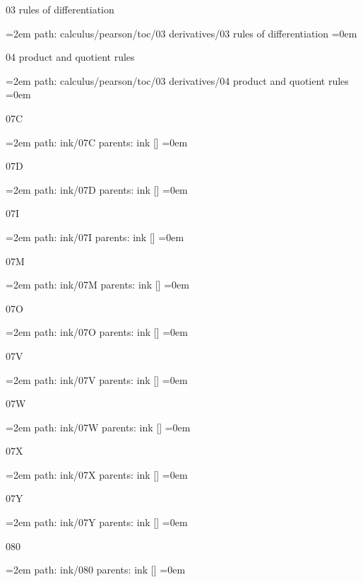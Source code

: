 03 rules of differentiation
\smallskip
\par\begingroup
\leftskip=2em
path: calculus/pearson/toc/03 derivatives/03 rules of differentiation
\smallskip
\leftskip=0em
\par\endgroup
\bigskip
{}
04 product and quotient rules
\smallskip
\par\begingroup
\leftskip=2em
path: calculus/pearson/toc/03 derivatives/04 product and quotient rules
\smallskip
\leftskip=0em
\par\endgroup
\bigskip
{}
07C
\smallskip
\par\begingroup
\leftskip=2em
path: ink/07C
\smallskip
parents:  ink []
\smallskip
\leftskip=0em
\par\endgroup
\bigskip
{}
07D
\smallskip
\par\begingroup
\leftskip=2em
path: ink/07D
\smallskip
parents:  ink []
\smallskip
\leftskip=0em
\par\endgroup
\bigskip
{}
07I
\smallskip
\par\begingroup
\leftskip=2em
path: ink/07I
\smallskip
parents:  ink []
\smallskip
\leftskip=0em
\par\endgroup
\bigskip
{}
07M
\smallskip
\par\begingroup
\leftskip=2em
path: ink/07M
\smallskip
parents:  ink []
\smallskip
\leftskip=0em
\par\endgroup
\bigskip
{}
07O
\smallskip
\par\begingroup
\leftskip=2em
path: ink/07O
\smallskip
parents:  ink []
\smallskip
\leftskip=0em
\par\endgroup
\bigskip
{}
07V
\smallskip
\par\begingroup
\leftskip=2em
path: ink/07V
\smallskip
parents:  ink []
\smallskip
\leftskip=0em
\par\endgroup
\bigskip
{}
07W
\smallskip
\par\begingroup
\leftskip=2em
path: ink/07W
\smallskip
parents:  ink []
\smallskip
\leftskip=0em
\par\endgroup
\bigskip
{}
07X
\smallskip
\par\begingroup
\leftskip=2em
path: ink/07X
\smallskip
parents:  ink []
\smallskip
\leftskip=0em
\par\endgroup
\bigskip
{}
07Y
\smallskip
\par\begingroup
\leftskip=2em
path: ink/07Y
\smallskip
parents:  ink []
\smallskip
\leftskip=0em
\par\endgroup
\bigskip
{}
080
\smallskip
\par\begingroup
\leftskip=2em
path: ink/080
\smallskip
parents:  ink []
\smallskip
\leftskip=0em
\par\endgroup
\bigskip
\bye
